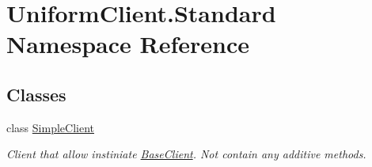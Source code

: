 \hypertarget{namespace_uniform_client_1_1_standard}{}\section{Uniform\+Client.\+Standard Namespace Reference}
\label{namespace_uniform_client_1_1_standard}
\subsection*{Classes}
\begin{DoxyCompactItemize}
\item 
class \mbox{\hyperlink{class_uniform_client_1_1_standard_1_1_simple_client}{Simple\+Client}}
\begin{DoxyCompactList}\small\item\em Client that allow instiniate \mbox{\hyperlink{class_uniform_client_1_1_base_client}{Base\+Client}}. Not contain any additive methods. \end{DoxyCompactList}\end{DoxyCompactItemize}
